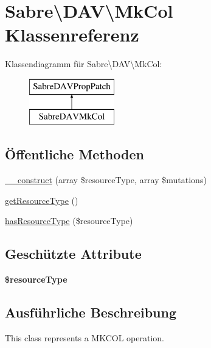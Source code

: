 \hypertarget{class_sabre_1_1_d_a_v_1_1_mk_col}{}\section{Sabre\textbackslash{}D\+AV\textbackslash{}Mk\+Col Klassenreferenz}
\label{class_sabre_1_1_d_a_v_1_1_mk_col}
Klassendiagramm für Sabre\textbackslash{}D\+AV\textbackslash{}Mk\+Col\+:\begin{figure}[H]
\begin{center}
\leavevmode
\includegraphics[height=2.000000cm]{class_sabre_1_1_d_a_v_1_1_mk_col}
\end{center}
\end{figure}
\subsection*{Öffentliche Methoden}
\begin{DoxyCompactItemize}
\item 
\mbox{\hyperlink{class_sabre_1_1_d_a_v_1_1_mk_col_ad55d7f010ebe4b4aa4f53f946e1a4285}{\+\_\+\+\_\+construct}} (array \$resource\+Type, array \$mutations)
\item 
\mbox{\hyperlink{class_sabre_1_1_d_a_v_1_1_mk_col_a892e7df32c05f8a9fe3bbf834f5d20a5}{get\+Resource\+Type}} ()
\item 
\mbox{\hyperlink{class_sabre_1_1_d_a_v_1_1_mk_col_aa9c37040f281f37be090d2e4dd66d559}{has\+Resource\+Type}} (\$resource\+Type)
\end{DoxyCompactItemize}
\subsection*{Geschützte Attribute}
\begin{DoxyCompactItemize}
\item 
\mbox{\label{class_sabre_1_1_d_a_v_1_1_mk_col_a4c246ef4cc0319ece8804991113968f4}} 
{\bfseries \$resource\+Type}
\end{DoxyCompactItemize}


\subsection{Ausführliche Beschreibung}
This class represents a M\+K\+C\+OL operation.

